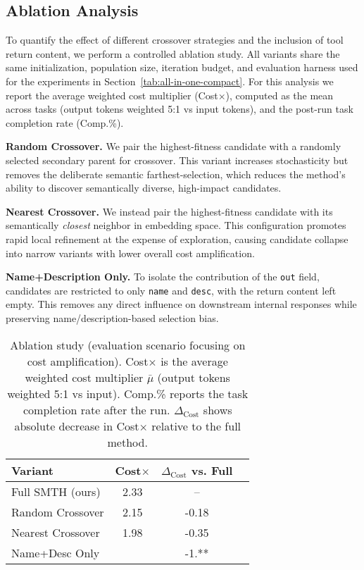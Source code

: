 \subsection{Ablation Analysis}
To quantify the effect of different crossover strategies and the inclusion of tool return content,
we perform a controlled ablation study. All variants share the same initialization, population size,
iteration budget, and evaluation harness used for the experiments in Section~\ref{tab:all-in-one-compact}.
For this analysis we report the average weighted cost multiplier (Cost$\times$), computed as the mean
across tasks (output tokens weighted 5:1 vs input tokens), and the post-run task completion rate (Comp.\%).

\textbf{Random Crossover.}
We pair the highest-fitness candidate with a randomly selected secondary parent for crossover.
This variant increases stochasticity but removes the deliberate semantic farthest-selection,
which reduces the method's ability to discover semantically diverse, high-impact candidates.

\textbf{Nearest Crossover.}
We instead pair the highest-fitness candidate with its semantically \emph{closest} neighbor in embedding space.
This configuration promotes rapid local refinement at the expense of exploration, causing candidate collapse
into narrow variants with lower overall cost amplification.

\textbf{Name+Description Only.}
To isolate the contribution of the \texttt{out} field, candidates are restricted to only \texttt{name} and \texttt{desc},
with the return content left empty. This removes any direct influence on downstream internal responses while
preserving name/description-based selection bias.

\begin{table}[t]
\centering
\small
\begin{tabular}{lccc}
\toprule
\textbf{Variant} & \textbf{Cost$\times$} & $\Delta_{\text{Cost}}$ vs. Full \\
\midrule
Full SMTH (ours)      & 2.33  & -- \\
Random Crossover       & 2.15  & -0.18 \\
Nearest Crossover      & 1.98  & -0.35 \\
Name+Desc Only         &  &  -1.** \\
\bottomrule
\end{tabular}
\caption{
Ablation study (evaluation scenario focusing on cost amplification).
Cost$\times$ is the average weighted cost multiplier $\bar\mu$ (output tokens weighted 5:1 vs input).
Comp.\% reports the task completion rate after the run.
$\Delta_{\text{Cost}}$ shows absolute decrease in Cost$\times$ relative to the full method.
}
\label{tab:ablation_costs}
\end{table}

